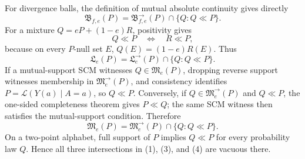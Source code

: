 For divergence balls, the definition of mutual absolute continuity gives directly
\[
 \mathfrak B_{f,e}(P)
 =\mathfrak B^{\to}_{f,e}(P)\cap\{Q:Q\ll P\}. \tag{1}
\]
For a mixture \(Q=eP+(1-e)R\), positivity gives
\[
 Q\ll P\quad\Longleftrightarrow\quad R\ll P, \tag{2}
\]
because on every \(P\)-null set \(E\), \(Q(E)=(1-e)R(E)\).  Thus
\[
 \mathfrak L_e(P)=\mathfrak L^{\to}_e(P)\cap\{Q:Q\ll P\}. \tag{3}
\]
If a mutual-support SCM witnesses \(Q\in\mathfrak M_e(P)\), dropping reverse support witnesses membership in \(\mathfrak M^{\to}_e(P)\), and consistency identifies \(P=\mathcal L(Y(a)\mid A=a)\), so \(Q\ll P\).  Conversely, if \(Q\in\mathfrak M^{\to}_e(P)\) and \(Q\ll P\), the one-sided completeness theorem gives \(P\ll Q\); the same SCM witness then satisfies the mutual-support condition.  Therefore
\[
 \mathfrak M_e(P)=\mathfrak M^{\to}_e(P)\cap\{Q:Q\ll P\}. \tag{4}
\]
On a two-point alphabet, full support of \(P\) implies \(Q\ll P\) for every probability law \(Q\).  Hence all three intersections in (1), (3), and (4) are vacuous there.